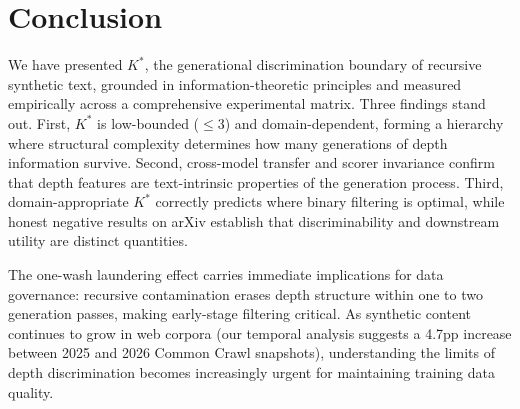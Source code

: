 \documentclass[11pt,a4paper]{article}
\begin{document}
\section{Conclusion}

We have presented $K^*$, the generational discrimination boundary of recursive synthetic text, grounded in information-theoretic principles and measured empirically across a comprehensive experimental matrix. Three findings stand out. First, $K^*$ is low-bounded ($\leq 3$) and domain-dependent, forming a hierarchy where structural complexity determines how many generations of depth information survive. Second, cross-model transfer and scorer invariance confirm that depth features are text-intrinsic properties of the generation process. Third, domain-appropriate $K^*$ correctly predicts where binary filtering is optimal, while honest negative results on arXiv establish that discriminability and downstream utility are distinct quantities.

The one-wash laundering effect carries immediate implications for data governance: recursive contamination erases depth structure within one to two generation passes, making early-stage filtering critical. As synthetic content continues to grow in web corpora (our temporal analysis suggests a 4.7pp increase between 2025 and 2026 Common Crawl snapshots), understanding the limits of depth discrimination becomes increasingly urgent for maintaining training data quality.
\end{document}
